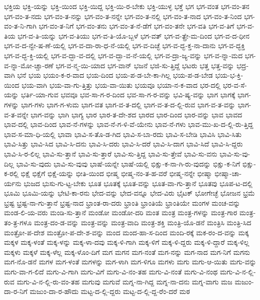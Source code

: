 {ಭಕ್ತಿಯ
ಭಕ್ತಿ-ಯನ್ನು
ಭಕ್ತಿ-ಯಿಂದ
ಭಕ್ತಿ-ಯಿದ್ದ
ಭಕ್ತಿ-ಯಿ-ರ-ಬೇಕು
ಭಕ್ತಿ-ಯುಳ್ಳ
ಭಕ್ತೆ
ಭಗ
ಭಗ-ವಂತ
ಭಗ-ವಂ-ತನ
ಭಗ-ವಂ-ತ-ನದು
ಭಗ-ವಂ-ತ-ನನ್ನು
ಭಗ-ವಂ-ತ-ನನ್ನೇ
ಭಗ-ವಂ-ತ-ನಲ್ಲಿ
ಭಗ-ವಂ-ತ-ನಾದ
ಭಗ-ವಂ-ತ-ನಿಂದ
ಭಗ-ವಂ-ತ-ನಿ-ಗಾಗಿ
ಭಗ-ವಂ-ತ-ನಿಗೆ
ಭಗ-ವಂ-ತನು
ಭಗ-ವಂ-ತ-ನೆ-ಡೆಗೆ
ಭಗ-ವಂ-ತನೇ
ಭಗ-ವತಿ
ಭಗ-ವ-ತಿಗೆ
ಭಗ-ವ-ತಿಯ
ಭಗ-ವ-ತಿ-ಯನ್ನು
ಭಗ-ವ-ತಿಯು
ಭಗ-ವ-ತಿ-ಯೊ-ಬ್ಬಳೆ
ಭಗ-ವತ್
ಭಗ-ವ-ತ್ಪ್ರೇ-ಮ-ದಿಂದ
ಭಗ-ವ-ದ-ಧೀನ
ಭಗ-ವ-ದ-ನ್ವೇ-ಷ-ಣೆ-ಯಲ್ಲಿ
ಭಗ-ವ-ದಾ-ರಾ-ಧ-ನೆ-ಯಲ್ಲಿ
ಭಗ-ವ-ದಿಚ್ಛೆ
ಭಗ-ವ-ದ್ಭ-ಕ್ತ-ನಾ-ದಾನು
ಭಗ-ವ-ದ್ಭಕ್ತಿ
ಭಗ-ವ-ದ್ಭ-ಕ್ತಿ-ಯಲ್ಲಿ
ಭಗ-ವ-ದ್ಭಾ-ವ-ದಲ್ಲಿ
ಭಗ-ವ-ದ್ಭಾ-ವ-ನೆ-ಯಲ್ಲಿ
ಭಗ-ವ-ದ್ರಾ-ಜ್ಯ-ವನ್ನು
ಭಗ-ವ-ನ್ನಾ-ಮದ
ಭಗ-ವ-ನ್ನಾ-ಮೋ-ಚ್ಚಾ-ರಣೆ
ಭಗ-ವ-ನ್ಮ-ಯಿ-ಯಾದ
ಭಗ-ವಾನ್
ಭಜನೆ
ಭಜಿ-ಸು-ತ್ತಿದ್ದೆ
ಭಟರು
ಭತ್ತ
ಭತ್ತ-ವನ್ನು
ಭದ್ರ-ವಾಗಿ
ಭನೆ
ಭಯ
ಭಯಂ-ಕ-ರ-ವಾದ
ಭಯ-ದಿಂದ
ಭಯ-ಪ-ಡ-ಬೇ-ಕಾ-ಗಿಲ್ಲ
ಭಯ-ಪ-ಡ-ಬೇಡ
ಭಯ-ಭ-ಕ್ತಿ-ಯಿಂದ
ಭಯ-ವಾಗಿ
ಭಯ-ವಾ-ಗು-ತ್ತಿತ್ತು
ಭಯ-ವಾ-ಯಿತು
ಭಯವೂ
ಭಯಾ-ನ-ಕ-ವಾದ
ಭರ-ದಲ್ಲಿ
ಭರ-ವ-ಸೆ-ಯನ್ನು
ಭರ್ತಿ-ಯಾ-ಗುವ
ಭವವೂ
ಭವ-ಸಾ-ಗ-ರ-ದಿಂದ
ಭವ-ಸಾ-ಗ-ರ-ವನ್ನು
ಭವಿ-ಷ್ಯ-ವನ್ನು
ಭಾಗ
ಭಾಗಕ್ಕೆ
ಭಾಗ-ಗಳನ್ನು
ಭಾಗ-ಗಳು
ಭಾಗ-ಗ-ಳುಮ
ಭಾಗ-ವತ
ಭಾಗ-ವ-ತ-ದಲ್ಲಿ
ಭಾಗ-ವ-ತ-ದ-ಲ್ಲಿ-ರುವ
ಭಾಗ-ವ-ತ-ವನ್ನು
ಭಾಗ-ವ-ತ-ವನ್ನೇ
ಭಾಗ-ವನ್ನು
ಭಾಗಿ
ಭಾಗ್ಯ
ಭಾರ
ಭಾರ-ತ-ದೇ-ಶದ
ಭಾರದ
ಭಾರ-ದಿಂದ
ಭಾರ-ವನ್ನು
ಭಾವ
ಭಾವದ
ಭಾವ-ದಲ್ಲಿ
ಭಾವ-ದಿಂದ
ಭಾವ-ನೆ-ಗಳನ್ನು
ಭಾವ-ನೆ-ಗ-ಳಿ-ವೆ-ಯೇನು
ಭಾವ-ನೆ-ಗಳು
ಭಾವ-ಮು-ಖ-ದ-ಲ್ಲಿ-ರು-ತ್ತಿದ್ದ
ಭಾವ-ಸ-ಮಾ-ಧಿ-ಯಲ್ಲಿ
ಭಾವಾ
ಭಾವಿ-ಸ-ತೊ-ಡ-ಗಿದ
ಭಾವಿ-ಸ-ಬಾ-ರದು
ಭಾವಿ-ಸ-ಬೇಡಿ
ಭಾವಿಸಿ
ಭಾವಿ-ಸಿತು
ಭಾವಿ-ಸಿತ್ತು
ಭಾವಿ-ಸಿದ
ಭಾವಿ-ಸಿ-ದನು
ಭಾವಿ-ಸಿ-ದರು
ಭಾವಿ-ಸಿ-ದರೆ
ಭಾವಿ-ಸಿ-ದಾಗ
ಭಾವಿ-ಸಿದೆ
ಭಾವಿ-ಸಿ-ದ್ದರು
ಭಾವಿ-ಸಿ-ರ-ಲಿಲ್ಲ
ಭಾವಿ-ಸು-ತ್ತಾನೆ
ಭಾವಿ-ಸು-ತ್ತಾರೆ
ಭಾವಿ-ಸು-ತ್ತಿದ್ದ
ಭಾವಿ-ಸು-ತ್ತೇವೆ
ಭಾವಿ-ಸು-ವನು
ಭಾವಿ-ಸು-ವು-ದಿಲ್ಲ
ಭಾವಿ-ಸು-ವುದು
ಭಾವಿ-ಸು-ವುವು
ಭಾಷೆ-ಯನ್ನೇ
ಭಾಷೆ-ಯಲ್ಲಿ
ಭಿಕ್ಷು-ಕ-ನಾ-ಗಿ-ರು-ವುದನ್ನು
ಭಿಕ್ಷು-ಕ-ನಿಗೆ
ಭಿಕ್ಷು-ಕ-ರಲ್ಲಿ
ಭಿಕ್ಷೆ
ಭಿಕ್ಷೆಗೆ
ಭಿಕ್ಷೆ-ಯನ್ನು
ಭೀತಿ-ಯಿಂದ
ಭೀಷ್ಮ
ಭೀಷ್ಮ-ನಂ-ತ-ಹ-ವರೆ
ಭೀಷ್ಮ-ನನ್ನೇ
ಭೀಷ್ಮಾ
ಭೀಷ್ಮಾ-ಚಾ-ರ್ಯನು
ಭುಜದ
ಭುಸು-ಗು-ಟ್ಟ-ಬೇಕು
ಭೂತ
ಭೂತಕ್ಕೆ
ಭೂತ-ವನ್ನು
ಭೂತ-ವಾ-ಗು-ತ್ತಾನೆ
ಭೂತವು
ಭೂಪ-ಟ-ದಲ್ಲಿ
ಭೂಮಿ
ಭೂಮಿ-ಯನ್ನು
ಭೇಟಿ-ಕಾ-ರನು
ಭೇದ-ವನ್ನು
ಭೇದ-ವನ್ನೂ
ಭೇದ-ವಿರು
ಭೈಟಕ್
ಭೋಗೇಚ್ಛೆ
ಭೋಜನ
ಭ್ರಮೆ
ಭ್ರಷ್ಟ
ಭ್ರಷ್ಟ-ನಾ-ಗು-ತ್ತಾನೆ
ಭ್ರಷ್ಟ-ನಾದ
ಭ್ರಾಂತ-ರಾ-ದರು
ಭ್ರಾಂತಿ
ಭ್ರಾಂತಿಯೆ
ಭ್ರಾಂತಿಯೇ
ಮಂಗಳ
ಮಂಚ-ವನ್ನು
ಮಂಡ-ಲಿ-ಯ-ವರು
ಮಂಡಿ-ಸು-ತ್ತಾನೆ
ಮಂಡೋ
ಮಂಡೋ-ದರಿ
ಮಂತ
ಮಂತ್ರ
ಮಂತ್ರ-ಗಳನ್ನು
ಮಂತ್ರ-ಗಾರ
ಮಂತ್ರ-ತಂ-ತ್ರ-ಗಳೂ
ಮಂತ್ರ-ದಂ-ಡ-ವನ್ನು
ಮಂತ್ರ-ವನ್ನು
ಮಂತ್ರ-ವಾದಿ
ಮಂತ್ರ-ಶಕ್ತಿ
ಮಂತ್ರಿ-ಯೊ-ಡನೆ
ಮಂತ್ರಿಸಿ
ಮಂತ್ರಿ-ಸಿದ
ಮಂತ್ರೋ-ಪ-ದೇಶ
ಮಂತ್ರೋ-ಪ-ದೇ-ಶ-ವನ್ನು
ಮಂದ
ಮಂದ-ಹಾ-ಸ-ದಿಂದ
ಮಂದಿ-ರಕ್ಕೆ
ಮಕ-ರಂ-ದ-ವನ್ನು
ಮಕ್ಕ
ಮಕ್ಕಳ
ಮಕ್ಕ-ಳಂತೆ
ಮಕ್ಕ-ಳನ್ನು
ಮಕ್ಕ-ಳಾ-ದವು
ಮಕ್ಕ-ಳಿ-ಗಾಗಿ
ಮಕ್ಕ-ಳಿಗೆ
ಮಕ್ಕ-ಳಿ-ದ್ದರು
ಮಕ್ಕ-ಳಿ-ದ್ದಾರೆ
ಮಕ್ಕ-ಳಿಲ್ಲ
ಮಕ್ಕಳು
ಮಕ್ಕಳೆ
ಮಕ್ಕ-ಳೆಲ್ಲ
ಮಕ್ಕ-ಳೊಂ-ದಿಗೆ
ಮಗ
ಮಗನ
ಮಗ-ನಂತೆ
ಮಗ-ನನ್ನು
ಮಗ-ನಾದ
ಮಗ-ನಿಗೆ
ಮಗನು
ಮಗ-ನೊ-ಡನೆ
ಮಗಳ
ಮಗ-ಳಂತೆ
ಮಗಳನ್ನು
ಮಗ-ಳಾಗಿ
ಮಗ-ಳಿಗೂ
ಮಗಳು
ಮಗು
ಮಗು-ಆ-ಯಿತು
ಮಗು-ವನ್ನು
ಮಗು-ವಾ-ಗ-ಲಿದೆ
ಮಗು-ವಿ-ಗಾಗಿ
ಮಗು-ವಿಗೆ
ಮಗು-ವಿ-ನಂ-ತಹ
ಮಗು-ವಿ-ನಂತೆ
ಮಗು-ವಿ-ನಂಥ
ಮಗು-ವಿ-ನ-ಲ್ಲಿ-ರುವ
ಮಗು-ವಿ-ನ-ಲ್ಲಿ-ರು-ವಂ-ತಹ
ಮಗುವು
ಮಗುವೆ
ಮಗ್ನ-ನಾ-ಗಿದ್ದ
ಮಗ್ನ-ನಾ-ದನು
ಮಗ್ನ-ವಾಗು
ಮಜ
ಮಜುಂ-ದಾ-ರ-ನಿಗೆ
ಮಜುಂ-ದಾ-ರ-ಹೌದು
ಮಟ್ಟ-ದ-ಲ್ಲಿ-ದ್ದರು
ಮಟ್ಟ-ದ-ಲ್ಲಿ-ದ್ದ-ರೆಂ-ದರೆ
ಮಠ
}
